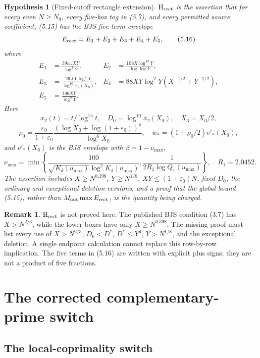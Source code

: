 \documentclass[11pt]{article}
\newtheorem{hypothesis}[theorem]{Hypothesis}
\theoremstyle{definition}
\newtheorem{remark}[theorem]{Remark}
\newcommand{\eps}{\varepsilon}
\begin{document}
\begin{hypothesis}[Fixed-cutoff rectangle extension]
\label{hyp:rect}
\(\mathrm{H}_{\rm rect}\) is the assertion that for every even \(N\ge N_0\),
every five-box tag in (5.7), and every permitted source coefficient,
(5.15) has the BJS five-term envelope
\[
 E_{\rm rect}=E_1+E_2+E_3+E_4+E_5,
\tag{5.16}
\]
where
\[
\begin{aligned}
 E_1&=\frac{39w_*XY}{\log^3Y},&
 E_2&=\frac{108X\log^{13}Y}{\log\log Y},\\
 E_3&=\frac{26XY\log^2Y}{\log^{10}x_2(X_0)},&
 E_4&=88XY\log^2Y(X^{-1/2}+Y^{-1/2}),\\
 E_5&=\frac{106XY}{\log^9Y}.
\end{aligned}
\tag{5.17}
\]
Here
\[
 x_2(t)=t/\log^{15}t,\quad
 D_0=\log^{10}x_2(X_0),\quad X_3=X_0/2,
\tag{5.18}
\]
\[
 \rho_0=\frac{\eps_0}{1+\eps_0}
 \frac{(\log X_0+\log(1+\eps_0))^5}{\log^6X_0},\quad
 w_*=(1+\rho_0/2)v'_*(X_0),
\tag{5.19}
\]
and \(v'_*(X_0)\) is the BJS envelope with
\(\beta=1-\nu_{\max}\),
\[
\nu_{\max}=
\min\left\{
\frac{100}{\sqrt{K_\delta(u_{\max})}\log^2K_\delta(u_{\max})},
\frac1{2R_1\log Q_1(u_{\max})}
\right\},
\quad R_1=2.0452.
\tag{5.20}
\]
The assertion includes \(X\ge N^{0.398}\), \(Y\ge N^{1/8}\),
\(XY\le(1+\eps_0)N\), fixed \(D_0\), the ordinary and exceptional
deletion versions, and a proof that the global bound (5.15), rather than
\(M_{\rm out}\max E_{\rm rect}\), is the quantity being charged.
\end{hypothesis}

\begin{remark}
\(\mathrm{H}_{\rm rect}\) is not proved here.  The published BJS condition
(3.7) has \(X>N^{2/3}\), while the lower boxes have only
\(X\ge N^{0.398}\).  The missing proof must list every use of
\(X>N^{2/3}\), \(D_0<D^*\), \(D^*\le Y^4\), \(Y>N^{1/8}\), and the
exceptional deletion.  A single endpoint calculation cannot replace this
row-by-row implication.  The five terms in (5.16) are written with explicit
plus signs; they are not a product of five fractions.
\end{remark}

\section{The corrected complementary-prime switch}
\label{sec:switch}

\subsection{The local-coprimality switch}
\label{sec:rough-switch}
\end{document}
